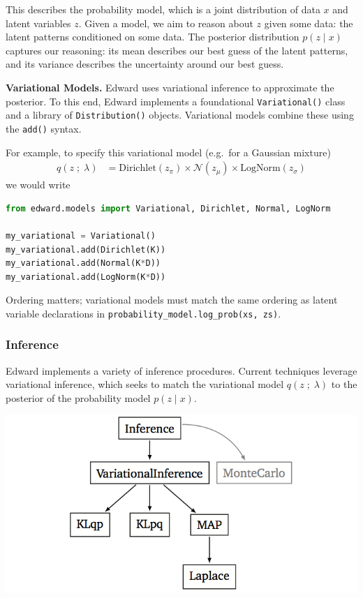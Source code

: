 This describes the probability model, which is a joint distribution of data $x$
and latent variables $z$. Given a model, we aim to reason about $z$ given some
data: the latent patterns conditioned on some data. The posterior distribution
$p(z \mid x)$ captures our reasoning: its mean describes our best guess of the
latent patterns, and its variance describes the uncertainty around our best
guess. 

\textbf{Variational Models.}
Edward uses variational inference to approximate the posterior. To this end,
Edward implements a foundational \texttt{Variational()} class and a library of
\texttt{Distribution()} objects. Variational models combine these using
the \texttt{add()} syntax.

For example, to specify this variational model (e.g.~for a Gaussian mixture)
\begin{align*}
  q(z \;;\; \lambda) 
  &=
  \text{Dirichlet}(z_\pi)
  \times
  \mathcal{N}(z_\mu)
  \times
  \text{LogNorm}(z_\sigma)
\end{align*}
we would write
\begin{lstlisting}[language=Python]
from edward.models import Variational, Dirichlet, Normal, LogNorm

my_variational = Variational()
my_variational.add(Dirichlet(K))
my_variational.add(Normal(K*D))
my_variational.add(LogNorm(K*D))
\end{lstlisting}
Ordering matters; variational models must match the same ordering as latent
variable declarations in \texttt{probability_model.log_prob(xs, zs)}.

\subsubsection{Inference}\label{inference}

Edward implements a variety of inference procedures. Current techniques
leverage variational inference, which seeks to match the variational model
$q(z \;;\; \lambda)$ to the posterior of the probability model 
$p(z \mid x)$.

\includegraphics{images/inference_structure.png}

